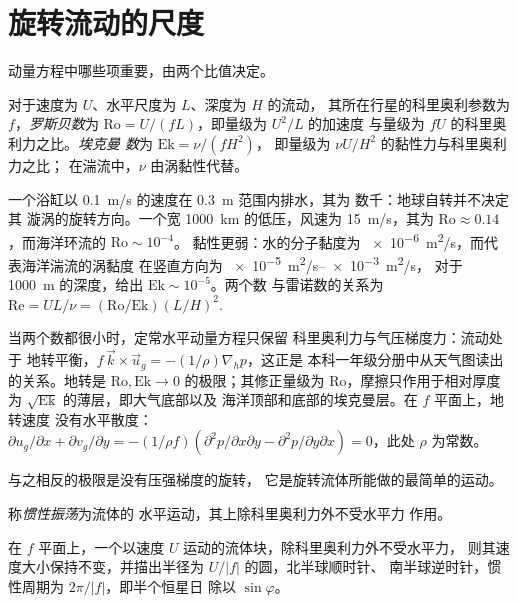 \section{旋转流动的尺度}\label{sec:b3:gfd-foundations:scales}

动量方程中哪些项重要，由两个比值决定。

\begin{definition}[罗斯贝数与埃克曼数]\label{def:b3:gfd-foundations:numbers}
对于速度为 $U$、水平尺度为 $L$、深度为 $H$ 的流动，
其所在行星的科里奥利参数为 $f$，\emph{罗斯贝数}为
$\mathrm{Ro} = U/(fL)$，即量级为 $U^2/L$ 的加速度
与量级为 $fU$ 的科里奥利力之比。\emph{埃克曼
数}为 $\mathrm{Ek} = \nu/(fH^2)$，
即量级为 $\nu U/H^2$ 的黏性力与科里奥利力之比；
在湍流中，$\nu$ 由涡黏性代替。
\end{definition}

一个浴缸以 \qty{0.1}{m/s} 的速度在 \qty{0.3}{m} 范围内排水，其为
数千：地球自转并不决定其
漩涡的旋转方向。一个宽 \qty{1000}{km} 的低压，风速为 \qty{15}{m/s}，其为
$\mathrm{Ro} \approx 0.14$，而海洋环流的 $\mathrm{Ro} \sim 10^{-4}$。
黏性更弱：水的分子黏度为
\qty{e-6}{m^2/s}，而代表海洋湍流的涡黏度
在竖直方向为 \qtyrange{e-5}{e-3}{m^2/s}，
对于 \qty{1000}{m} 的深度，给出 $\mathrm{Ek} \sim 10^{-5}$。两个数
与雷诺数的关系为 $\mathrm{Re} = UL/\nu =
(\mathrm{Ro}/\mathrm{Ek})(L/H)^2$.

当两个数都很小时，定常水平动量方程只保留
科里奥利力与气压梯度力：流动处于
地转平衡，$f\,\vec k\times\vec u_g = -(1/\rho)\nabla_h p$，这正是
本科一年级分册中从天气图读出的关系。地转是
$\mathrm{Ro}, \mathrm{Ek}\to 0$ 的极限；其修正量级为
$\mathrm{Ro}$，摩擦只作用于相对厚度为
$\sqrt{\mathrm{Ek}}$ 的薄层，即大气底部以及
海洋顶部和底部的埃克曼层。在 $f$ 平面上，地转速度
没有水平散度：$\partial u_g/\partial x + \partial
v_g/\partial y = -(1/\rho f)(\partial^2 p/\partial x\partial y -
\partial^2 p/\partial y\partial x) = 0$，此处 $\rho$ 为常数。

与之相反的极限是没有压强梯度的旋转，
它是旋转流体所能做的最简单的运动。

\begin{definition}[惯性振荡]\label{def:b3:gfd-foundations:inertial}
称\emph{惯性振荡}为流体的
水平运动，其上除科里奥利力外不受水平力
作用。
\end{definition}

\begin{theorem}[惯性圆]\label{thm:b3:gfd-foundations:inertial}
在 $f$ 平面上，一个以速度 $U$ 运动的流体块，除科里奥利力外不受水平力，
则其速度大小保持不变，并描出半径为
$U/|f|$ 的圆，北半球顺时针、
南半球逆时针，惯性周期为 $2\pi/|f|$，即半个恒星日
除以 $\sin\varphi$。
\end{theorem}

